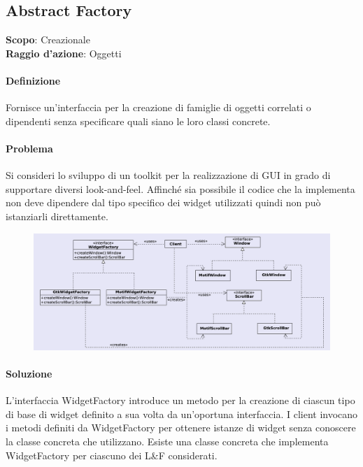 \subsection{Abstract Factory}
\label{abstract-factory}

\textbf{Scopo}: Creazionale \\
\textbf{Raggio d'azione}: Oggetti

\paragraph{Definizione} Fornisce un’interfaccia per la creazione di famiglie di oggetti correlati o dipendenti senza specificare quali siano le loro classi concrete.

\paragraph{Problema} Si consideri lo sviluppo di un toolkit per la realizzazione di GUI in grado di supportare diversi look-and-feel. Affinché sia possibile il codice che la implementa non deve dipendere dal tipo specifico dei widget utilizzati quindi non può istanziarli direttamente.

\begin{figure}[H]
    \centering
    \includegraphics[width=1\linewidth]{assets/pattern/abstract-factory/abstract-factory-esempio.png}
\end{figure}

\paragraph{Soluzione} L’interfaccia WidgetFactory introduce un metodo per la creazione di ciascun tipo di base di widget definito a sua volta da un’oportuna interfaccia. I client invocano i metodi definiti da WidgetFactory per ottenere istanze di widget senza conoscere la classe concreta che utilizzano. Esiste una classe concreta che implementa WidgetFactory per ciascuno dei L\&F considerati.

